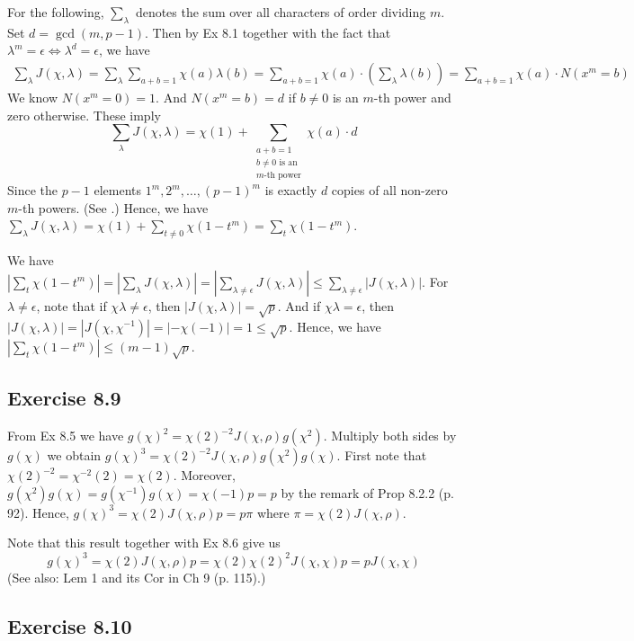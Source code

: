 \documentclass[../I&R.tex]{subfiles}
\begin{document}
For the following, $\sum_\lambda$ denotes the sum over all characters of order dividing $m$. Set $d=\gcd(m,p-1)$. Then by Ex 8.1 together with the fact that $\lambda^m=\epsilon \iff \lambda^d=\epsilon$, we have
\begin{align*}
\sum_\lambda J(\chi,\lambda) = \sum_\lambda \sum_{a+b=1} \chi(a)\lambda(b) = \sum_{a+b=1} \chi(a)\cdot\left(\sum_\lambda \lambda(b)\right) = \sum_{a+b=1}\chi(a)\cdot N(x^m=b)
\end{align*}
We know $N(x^m=0)=1$. And $N(x^m=b)=d$ if $b\neq0$ is an $m$-th power and zero otherwise. These imply $$\sum_\lambda J(\chi,\lambda) = \chi(1) + \sum_{\substack{a+b=1\\ b\neq0 \text{ is an } \\ m\text{-th power}}} \chi(a)\cdot d$$
Since the $p-1$ elements $1^m,2^m,\ldots,(p-1)^m$ is exactly $d$ copies of all non-zero $m$-th powers. (See .) Hence, we have $\sum_\lambda J(\chi,\lambda) = \chi(1) + \sum_{t\neq0} \chi(1-t^m) = \sum_t \chi(1-t^m)$.

We have $|\sum_t \chi(1-t^m)| = |\sum_\lambda J(\chi,\lambda)| =  |\sum_{\lambda\neq\epsilon} J(\chi,\lambda)| \leq \sum_{\lambda\neq\epsilon} |J(\chi,\lambda)|$. For $\lambda\neq\epsilon$, note that if $\chi\lambda\neq\epsilon$, then $|J(\chi,\lambda)|=\sqrt{p}$. And if $\chi\lambda=\epsilon$, then $|J(\chi,\lambda)| = |J(\chi,\chi^{-1})| = |-\chi(-1)| = 1\leq\sqrt{p}$. Hence, we have $|\sum_t \chi(1-t^m)|\leq (m-1)\sqrt{p}$.

\subsection*{Exercise 8.9}

From Ex 8.5 we have $g(\chi)^2=\chi(2)^{-2}J(\chi,\rho)g(\chi^2)$. Multiply both sides by $g(\chi)$ we obtain $g(\chi)^3=\chi(2)^{-2}J(\chi,\rho)g(\chi^2)g(\chi)$. First note that $\chi(2)^{-2}=\chi^{-2}(2)=\chi(2)$. Moreover, $g(\chi^2)g(\chi)=g(\chi^{-1})g(\chi)=\chi(-1)p=p$ by the remark of Prop 8.2.2 (p. 92). Hence, $g(\chi)^3=\chi(2)J(\chi,\rho)p=p\pi$ where $\pi=\chi(2)J(\chi,\rho)$.

Note that this result together with Ex 8.6 give us $$g(\chi)^3=\chi(2)J(\chi,\rho)p=\chi(2)\chi(2)^2J(\chi,\chi)p=pJ(\chi,\chi)$$
(See also: Lem 1 and its Cor in Ch 9 (p. 115).)

\subsection*{Exercise 8.10}
\end{document}
